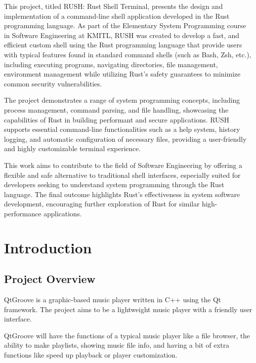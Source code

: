 \documentclass[12pt]{report} %
\begin{document}
\hspace{1cm}This project, titled RUSH: Rust Shell Terminal, presents the design and
implementation of a command-line shell application developed in the Rust programming
language. As part of the Elementary System Programming course in Software Engineering
at KMITL, RUSH was created to develop a fast, and efficient custom shell using the
Rust programming language that provide users with typical features found in standard
command shells (such as Bash, Zsh, etc.), including executing programs, navigating
directories, file management, environment management while utilizing Rust’s safety
guarantees to minimize common security vulnerabilities.


The project demonstrates a range of system programming concepts, including process
management, command parsing, and file handling, showcasing the capabilities of Rust in
building performant and secure applications. RUSH supports essential command-line
functionalities such as a help system, history logging, and automatic configuration of
necessary files, providing a user-friendly and highly customizable terminal experience.

This work aims to contribute to the field of Software Engineering by offering a flexible
and safe alternative to traditional shell interfaces, especially suited for developers
seeking to understand system programming through the Rust language. The final outcome
highlights Rust’s effectiveness in system software development, encouraging further
exploration of Rust for similar high-performance applications.

\newpage
\tableofcontents
\newpage

\chapter{Introduction}
\section{Project Overview}


\hspace{1cm}QtGroove is a graphic-based music player written in C++ using the Qt framework. The project
aims to be a lightweight music player with a friendly user interface. 	

QtGroove will have the functions of a typical music player like a file browser, the ability to make
playlists, showing music file info, and having a bit of extra functions like speed up playback or player
customization.
\end{document}
